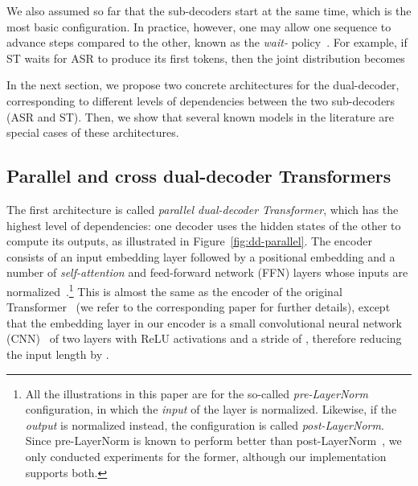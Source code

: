 \documentclass[11pt]{article}
\theoremstyle{plain}
\theoremstyle{definition}
\begin{document}
We also assumed so far that the sub-decoders start at the same time, which is the most basic configuration. In practice, however, one may allow one sequence to advance  steps compared to the other, known as the \emph{wait-} policy~\cite{Ma19acl}. For example, if ST waits for ASR to produce its first  tokens, then the joint distribution becomes



In the next section, we propose two concrete architectures for the dual-decoder, corresponding to different levels of  dependencies between the two sub-decoders (ASR and ST). Then, we show that several known models in the literature are special cases of these architectures.

\subsection{Parallel and cross dual-decoder Transformers}
\label{sec:dd_parallel}
The first architecture is called \emph{parallel dual-decoder Transformer}, which has the highest level of dependencies: one decoder uses the hidden states of the other to compute its outputs, as illustrated in Figure~\ref{fig:dd-parallel}.
The encoder consists of an input embedding layer followed by a positional embedding and a number of \emph{self-attention} and feed-forward network (FFN) layers whose inputs are normalized~\cite{ba2016layer}.\footnote{All the illustrations in this paper are for the so-called \emph{pre-LayerNorm} configuration, in which the \emph{input} of the layer is normalized. Likewise, if the \emph{output} is normalized instead, the configuration is called \emph{post-LayerNorm}. Since pre-LayerNorm is known to perform better than post-LayerNorm~\cite{wang2019learning,nguyen2019transformers}, we only conducted experiments for the former, although our implementation supports both.} This is almost the same as the encoder of the original Transformer~\cite{vaswani2017attention} (we refer to the corresponding paper for further details), except that the embedding layer in our encoder is a small convolutional neural network (CNN)~\cite{fukushima1982neocognitron,lecun1989backpropagation} of two layers with ReLU activations and a stride of , therefore reducing the input length by .
\end{document}
